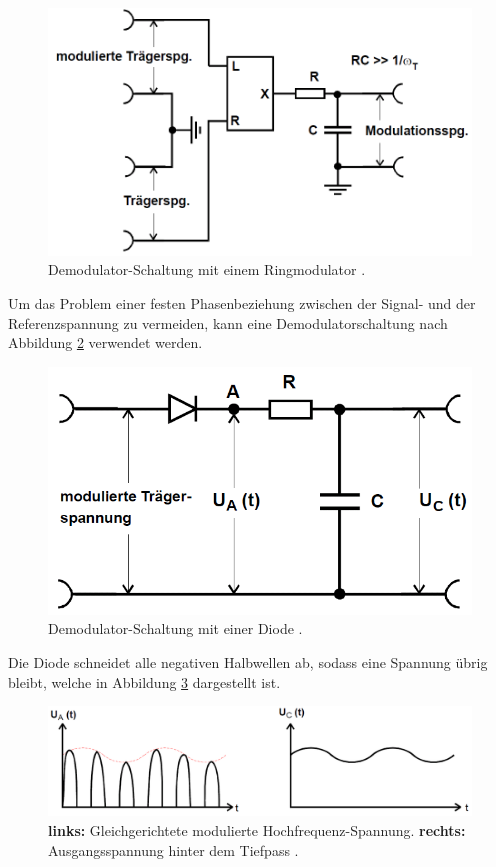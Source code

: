 \begin{figure}[!h]
    \centering
    \includegraphics[width = 14cm]{images/adm_ringmodulator.png}
    \caption{Demodulator-Schaltung mit einem Ringmodulator \cite{V59}.}
    \label{fig:adm_ringmodulator}
\end{figure}

Um das Problem einer festen Phasenbeziehung zwischen der Signal- und der Referenzspannung zu vermeiden, kann eine Demodulatorschaltung nach Abbildung \ref{fig:dioden-schaltung} verwendet werden.

\begin{figure}[!h]
    \centering
    \includegraphics[width = 14cm]{images/adm_diode.png}
    \caption{Demodulator-Schaltung mit einer Diode \cite{V59}.}
    \label{fig:dioden-schaltung}
\end{figure}

Die Diode schneidet alle negativen Halbwellen ab, sodass eine Spannung übrig bleibt, welche in Abbildung \ref{adm:spannung} dargestellt ist.

\begin{figure}[!h]
    \centering
    \includegraphics[width = 14cm]{images/adm_spannung.png}
    \caption{\textbf{links:} Gleichgerichtete modulierte Hochfrequenz-Spannung. \textbf{rechts:} Ausgangsspannung hinter dem Tiefpass \cite{V59}.}
    \label{adm:spannung}
\end{figure}

